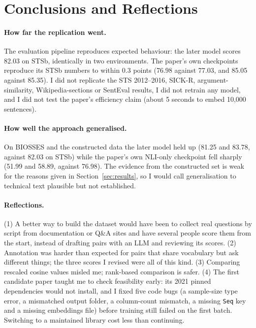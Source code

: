 \documentclass[11pt]{article}
\begin{document}
\section{Conclusions and Reflections}
\label{sec:conclusions}

\paragraph{How far the replication went.}
The evaluation pipeline reproduces expected behaviour: the later model scores 82.03 on STSb, identically in two environments. The paper's own checkpoints reproduce its STSb numbers to within 0.3 points (76.98 against 77.03, and 85.05 against 85.35). I did not replicate the STS 2012--2016, SICK-R, argument-similarity, Wikipedia-sections or SentEval results, I did not retrain any model, and I did not test the paper's efficiency claim (about 5 seconds to embed 10,000 sentences).

\paragraph{How well the approach generalised.}
On BIOSSES and the constructed data the later model held up (81.25 and 83.78, against 82.03 on STSb) while the paper's own NLI-only checkpoint fell sharply (51.99 and 58.89, against 76.98). The evidence from the constructed set is weak for the reasons given in Section~\ref{sec:results}, so I would call generalisation to technical text plausible but not established.

\paragraph{Reflections.}
(1) A better way to build the dataset would have been to collect real questions by script from documentation or Q\&A sites and have several people score them from the start, instead of drafting pairs with an LLM and reviewing its scores. (2) Annotation was harder than expected for pairs that share vocabulary but ask different things; the three scores I revised were all of this kind. (3) Comparing rescaled cosine values misled me; rank-based comparison is safer. (4) The first candidate paper taught me to check feasibility early: its 2021 pinned dependencies would not install, and I fixed five code bugs (a sample-size type error, a mismatched output folder, a column-count mismatch, a missing \texttt{Seq} key and a missing embeddings file) before training still failed on the first batch. Switching to a maintained library cost less than continuing.
\end{document}
